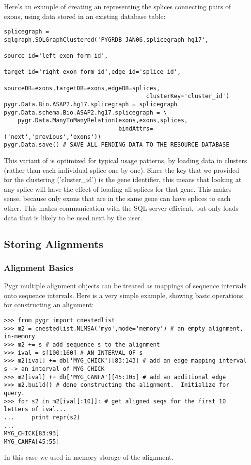 \documentclass{howto}
\begin{document}
Here's an example of creating an  representing
the splices connecting pairs of exons, using data stored in an
existing database table:
\begin{verbatim}
splicegraph = sqlgraph.SQLGraphClustered('PYGRDB_JAN06.splicegraph_hg17',
                                         source_id='left_exon_form_id',
                                         target_id='right_exon_form_id',edge_id='splice_id',
                                         sourceDB=exons,targetDB=exons,edgeDB=splices,
                                         clusterKey='cluster_id')
pygr.Data.Bio.ASAP2.hg17.splicegraph = splicegraph
pygr.Data.schema.Bio.ASAP2.hg17.splicegraph = \
    pygr.Data.ManyToManyRelation(exons,exons,splices,
                                 bindAttrs=('next','previous','exons'))
pygr.Data.save() # SAVE ALL PENDING DATA TO THE RESOURCE DATABASE
\end{verbatim}
This variant of  is optimized for typical usage patterns,
by loading data in clusters (rather than each individual splice one by one).
Since the key that we provided for the clustering ('cluster_id') is the 
gene identifier, this means that looking at any splice will have the effect
of loading all splices for that gene.  This makes sense, because only exons
that are in the same gene can have splices to each other.  This makes
communication with the SQL server efficient, but only loads data that
is likely to be used next by the user.

\subsection{Storing Alignments}
\subsubsection{Alignment Basics}

Pygr multiple alignment objects can be treated as mappings of sequence intervals onto sequence intervals.  Here is a very simple example, showing basic operations for constructing an alignment:

\begin{verbatim}
>>> from pygr import cnestedlist
>>> m2 = cnestedlist.NLMSA('myo',mode='memory') # an empty alignment, in-memory
>>> m2 += s # add sequence s to the alignment
>>> ival = s[100:160] # AN INTERVAL OF s
>>> m2[ival] += db['MYG_CHICK'][83:143] # add an edge mapping interval s -> an interval of MYG_CHICK
>>> m2[ival] += db['MYG_CANFA'][45:105] # add an additional edge
>>> m2.build() # done constructing the alignment.  Initialize for query.
>>> for s2 in m2[ival[:10]]: # get aligned seqs for the first 10 letters of ival...
...     print repr(s2)
...
MYG_CHICK[83:93]
MYG_CANFA[45:55]
\end{verbatim}
In this case we used in-memory storage of the alignment.  
\end{document}
